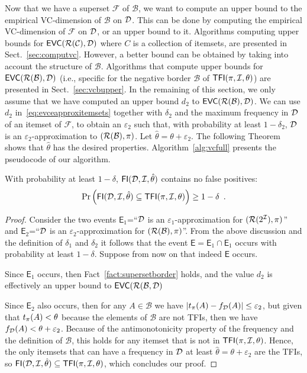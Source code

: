 Now that we
have a superset $\mathcal{F}$ of $\mathcal{B}$, we want to compute an upper
bound to the empirical VC-dimension of $\mathcal{B}$ on ${\cal D}$.
This can be done by computing the empirical VC-dimension of $\mathcal{F}$ on ${\cal D}$,
or an upper bound to it.
Algorithms computing upper bounds for $\mathsf{EVC}(\mathcal{R}(\mathcal{C}),{\cal D})$
 where $C$ is a collection of itemsets, are presented in Sect.~\ref{sec:computvc}.
However, a better bound can be obtained by taking into account the structure
of $\mathcal{B}$. Algorithms that compute upper bounds for $\mathsf{EVC}(\mathcal{R}(\mathcal{B}),{\cal D})$ (i.e., specific for
the negative border $\mathcal{B}$ of $\mathsf{TFI}(\pi,{\cal I},\theta)$) are presented in
Sect.~\ref{sec:vcbupper}. In the remaining of this section, we only
assume that we have computed an upper bound $d_2$ to $\mathsf{EVC}(\mathcal{R}(\mathcal{B}),{\cal D})$.
We can use $d_2$ in~\eqref{eq:evceapproxitemsets}
together with $\delta_2$ and the maximum frequency in ${\cal D}$ of an itemset of
$\mathcal{F}$, to obtain an $\varepsilon_2$ such that, with probability
at least $1-\delta_2$, ${\cal D}$ is an $\varepsilon_2$-approximation to
$(\mathcal{R}(\mathcal{B}),\pi)$. Let $\hat{\theta}=\theta+\varepsilon_2$. The
following Theorem shows that $\hat{\theta}$ has the desired properties.
Algorithm~\ref{alg:vcfull} presents the pseudocode of our algorithm.


\begin{theorem}\label{lem:vcfull}
With probability at least $1-\delta$, $\mathsf{FI}({\cal D},{\cal I},\hat\theta)$ contains no
false positives:
\[
\Pr\left(\mathsf{FI}({\cal D},{\cal I},\hat\theta)\subseteq\mathsf{TFI}(\pi,{\cal I},\theta)\right)\ge 1-\delta\enspace.\]
\end{theorem}
\begin{proof}
  Consider the two events $\mathsf{E}_1$=``${\cal D}$ is an
  $\varepsilon_1$-approximation for $(\mathcal{R}(2^{\cal I}),\pi)$'' and
  $\mathsf{E}_2$=``${\cal D}$ is an $\varepsilon_2$-approximation for
  $(\mathcal{R}(\mathcal{B}),\pi)$''. From the above discussion and the definition
  of $\delta_1$ and $\delta_2$ it follows that the event
  $\mathsf{E}=\mathsf{E}_1\cap\mathsf{E}_1$ occurs with probability at least
  $1-\delta$. Suppose from now on that indeed $\mathsf{E}$ occurs.

  Since $\mathsf{E}_1$ occurs, then Fact~\ref{fact:supersetborder} holds, and
  the value $d_2$ is effectively an upper bound to $\mathsf{EVC}(\mathcal{R}(\mathcal{B},{\cal D})$

  Since $\mathsf{E}_2$ also occurs, then for any $A\in\mathcal{B}$ we have
  $|t_\pi(A)-f_{\cal D}(A)|\le\varepsilon_2$, but given that $t_\pi(A)<\theta$
  because the elements of $\mathcal{B}$ are not TFIs, then we have
  $f_{\cal D}(A)<\theta+\varepsilon_2$. Because of the antimonotonicity property of
  the frequency and the definition of $\mathcal{B}$, this holds for any itemset
  that is not in $\mathsf{TFI}(\pi,{\cal I},\theta)$. Hence, the only itemsets that can
  have a frequency in ${\cal D}$ at least $\hat{\theta}=\theta+\varepsilon_2$ are the
  TFIs, so $\mathsf{FI}({\cal D},{\cal I},\hat{\theta})\subseteq\mathsf{TFI}(\pi,{\cal I},\theta)$, which
  concludes our proof.
\end{proof}

